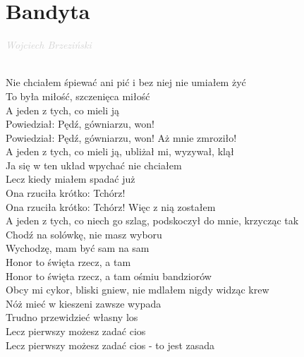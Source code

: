 \documentclass[a5paper, 10pt]{book}
\begin{document}
\newpage
\section{Bandyta}\textcolor{lightgray}{\textit{Wojciech Brzeziński}}\\~\\
\begin{minipage}[t]{0.81\textwidth}
  Nie chciałem śpiewać ani pić i bez niej nie umiałem żyć\\
  To była miłość, szczenięca miłość\\
\hspace*{5mm}  A jeden z tych, co mieli ją\\
\hspace*{5mm}  Powiedział: Pędź, gówniarzu, won!\\
\hspace*{5mm}  Powiedział: Pędź, gówniarzu, won! Aż mnie zmroziło!\\
  
  A jeden z tych, co mieli ją, ubliżał mi, wyzywał, klął\\
  Ja się w ten układ wpychać nie chciałem\\
\hspace*{5mm}Lecz kiedy miałem spadać już\\
\hspace*{5mm}Ona rzuciła krótko: Tchórz!\\
\hspace*{5mm}Ona rzuciła krótko: Tchórz! Więc z nią zostałem\\

A jeden z tych, co niech go szlag, podskoczył do mnie, krzycząc tak\\
Chodź na solówkę, nie masz wyboru\\
\hspace*{5mm}Wychodzę, mam być sam na sam\\
\hspace*{5mm}Honor to święta rzecz, a tam\\
\hspace*{5mm}Honor to święta rzecz, a tam ośmiu bandziorów\\

Obcy mi cykor, bliski gniew, nie mdlałem nigdy widząc krew\\
Nóż mieć w kieszeni zawsze wypada\\
\hspace*{5mm}Trudno przewidzieć własny los\\
\hspace*{5mm}Lecz pierwszy możesz zadać cios\\
\hspace*{5mm}Lecz pierwszy możesz zadać cios - to jest zasada\\


\end{minipage}
\end{document}
